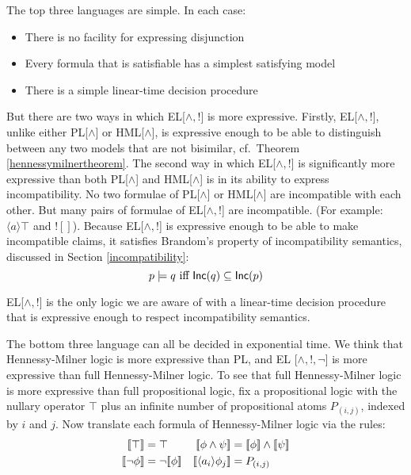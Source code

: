 \NI The top three languages are simple. In each case:

\begin{itemize}
\item
There is no facility for expressing disjunction
\item
Every formula that is satisfiable has a simplest satisfying model
\item
There is a simple linear-time decision procedure
\end{itemize}

\NI But there are two ways in which EL[$\land, !$] is more expressive.
Firstly, EL[$\land, !$], unlike either PL[$\land$] or HML[$\land$], is
expressive enough to be able to distinguish between any two models
that are not bisimilar, cf.~Theorem
\ref{hennessymilnertheorem}.  The second way in which
EL[$\land, !$] is significantly more expressive than both PL[$\land$]
and HML[$\land$] is in its ability to express incompatibility.  No two
formulae of PL[$\land$] or HML[$\land$] are incompatible with each
other.  But many
pairs of formulae of EL[$\land, !$] are incompatible.  (For example:
$\langle a \rangle \top$ and $! []$).  Because EL[$\land, !$] is
expressive enough to be able to make incompatible claims, it satisfies
Brandom's property of incompatibility semantics, discussed in Section
\ref{incompatibility}:
\[
   p \models q \mbox{ iff } \mathsf{Inc}(q) \subseteq \mathsf{Inc}(p)
\]

\NI EL[$\land, !$] is the only logic we are aware of with a
linear-time decision procedure that is expressive enough to respect
incompatibility semantics. 

The bottom three language can all be decided in exponential time.  We
think that Hennessy-Milner logic is more expressive than PL, and EL
[$\land, !, \neg$] is more expressive than full Hennessy-Milner logic.
To see that full Hennessy-Milner logic is more expressive than full
propositional logic, fix a propositional logic with the nullary
operator $\top$ plus an infinite number of propositional atoms
$P_{(i,j)}$, indexed by $i$ and $j$.  Now translate each formula of
Hennessy-Milner logic via the rules:
\begin{align*}
  \SEMB{\top}  & =  \top  &
  \SEMB{\phi \land \psi} & =  \SEMB{\phi} \land \SEMB{\psi}  \\
  \SEMB{\neg \phi} & =  \neg \SEMB{\phi}   &
  \SEMB{\langle a_i \rangle \phi_j} & =  P_{(i,j)} 
\end{align*}

